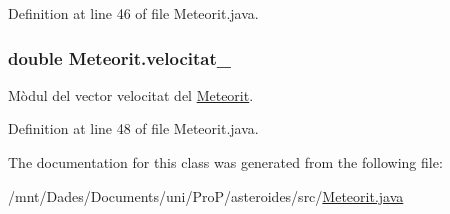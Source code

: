 Definition at line 46 of file Meteorit.\+java.

\hypertarget{class_meteorit_a6d567bfb1f4d118c6c36c7bff76ec28a}{}
\subsubsection[{velocitat\+\_\+}]{\setlength{\rightskip}{0pt plus 5cm}double Meteorit.\+velocitat\+\_\+\hspace{0.3cm}{\ttfamily [private]}}\label{class_meteorit_a6d567bfb1f4d118c6c36c7bff76ec28a}


Mòdul del vector velocitat del \hyperlink{class_meteorit}{Meteorit}. 



Definition at line 48 of file Meteorit.\+java.



The documentation for this class was generated from the following file\+:\begin{DoxyCompactItemize}
\item 
/mnt/\+Dades/\+Documents/uni/\+Pro\+P/asteroides/src/\hyperlink{_meteorit_8java}{Meteorit.\+java}\end{DoxyCompactItemize}
